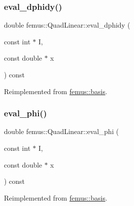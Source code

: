\mbox{\label{classfemus_1_1_quad_linear_a63d5770730442b7e6e5fe81e03a862e7}} 
\subsubsection{\texorpdfstring{eval\+\_\+dphidy()}{eval\_dphidy()}}
{\footnotesize\ttfamily double femus\+::\+Quad\+Linear\+::eval\+\_\+dphidy (\begin{DoxyParamCaption}\item[{const int $\ast$}]{I,  }\item[{const double $\ast$}]{x }\end{DoxyParamCaption}) const\hspace{0.3cm}{\ttfamily [virtual]}}



Reimplemented from \mbox{\hyperlink{classfemus_1_1basis_a2819fac9aae797156b9efec8a0b85cc1}{femus\+::basis}}.

\mbox{\label{classfemus_1_1_quad_linear_aaec6a3a20ec48047ff1de4bbe75a5018}} 
\subsubsection{\texorpdfstring{eval\+\_\+phi()}{eval\_phi()}}
{\footnotesize\ttfamily double femus\+::\+Quad\+Linear\+::eval\+\_\+phi (\begin{DoxyParamCaption}\item[{const int $\ast$}]{I,  }\item[{const double $\ast$}]{x }\end{DoxyParamCaption}) const\hspace{0.3cm}{\ttfamily [virtual]}}



Reimplemented from \mbox{\hyperlink{classfemus_1_1basis_a89b0797cdccffae5ff6d059b32016ae5}{femus\+::basis}}.

\mbox{\label{classfemus_1_1_quad_linear_a8d265ad93c9d368a7c1af3a7edac1daf}} 
